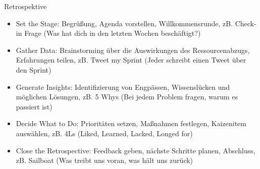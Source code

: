 \documentclass{article}
\begin{document}
\begin{exercise}{Retrospektive}
\begin{enumerate}
          \begin{solution}
            \begin{itemize}
              \item Set the Stage: Begrüßung, Agenda vorstellen, Willkommensrunde, zB. Check-in Frage (Was hat dich in den letzten Wochen beschäftigt?)
              \item Gather Data: Brainstorming über die Auswirkungen des Ressourcenabzugs, Erfahrungen teilen, zB. Tweet my Sprint (Jeder schreibt einen Tweet über den Sprint)
              \item Generate Insights: Identifizierung von Engpässen, Wissenslücken und möglichen Lösungen, zB. 5 Whys (Bei jedem Problem fragen, warum es passiert ist)
              \item Decide What to Do: Prioritäten setzen, Maßnahmen festlegen, Kaizenitem auswählen, zB. 4Ls (Liked, Learned, Lacked, Longed for)
              \item Close the Retrospective: Feedback geben, nächste Schritte planen, Abschluss, zB. Sailboat (Was treibt uns voran, was hält uns zurück)
            \end{itemize}
          \end{solution}
  \end{enumerate}
\end{exercise}
\end{document}
